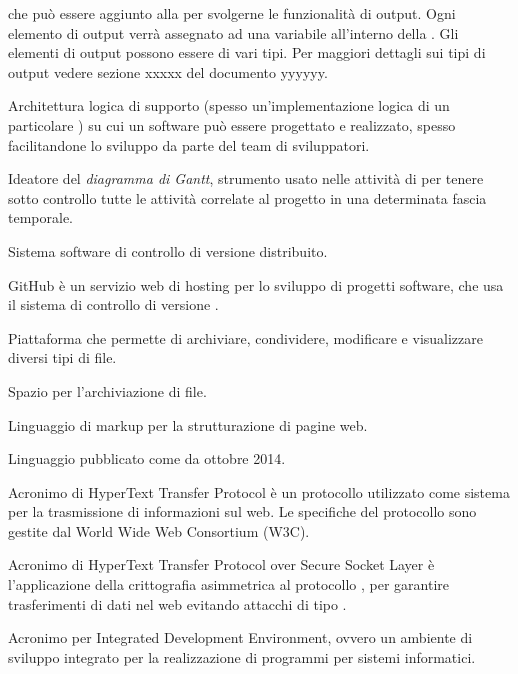  che può essere aggiunto alla  per svolgerne le funzionalit\`a di output. Ogni elemento di output verr\`a assegnato ad una variabile all’interno della . Gli elementi di output possono essere di vari tipi. Per maggiori dettagli sui tipi di output vedere sezione xxxxx del documento yyyyyy.
\clearpage

Architettura logica di supporto (spesso un'implementazione logica di un particolare ) su cui un software può essere progettato e realizzato, spesso facilitandone lo sviluppo da parte del team di sviluppatori.
\clearpage

Ideatore del \textit{diagramma di Gantt}, strumento usato nelle attività di  per tenere sotto controllo tutte le attività correlate al progetto in una determinata fascia temporale.

Sistema software di controllo di versione distribuito.

GitHub è un servizio web di hosting per lo sviluppo di progetti software, che usa il sistema di controllo di versione .

Piattaforma che permette di archiviare, condividere, modificare e visualizzare diversi tipi di file.
\clearpage

Spazio per l’archiviazione di file.

Linguaggio di markup per la strutturazione di pagine web.

Linguaggio  pubblicato come  da ottobre 2014.

Acronimo di HyperText Transfer Protocol \`e un protocollo utilizzato come sistema per la trasmissione di informazioni sul web. Le specifiche del protocollo sono gestite dal World Wide Web Consortium (W3C).

Acronimo di  HyperText Transfer Protocol over Secure Socket Layer \`e l'applicazione della crittografia asimmetrica al protocollo , per garantire trasferimenti di dati nel web evitando attacchi di tipo .
\clearpage

Acronimo per Integrated Development Environment, ovvero un ambiente di sviluppo integrato per la realizzazione di programmi per sistemi informatici.

